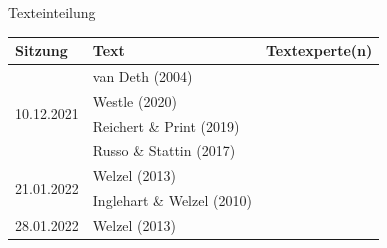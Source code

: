 \documentclass[11pt]{beamer}
\begin{document}
\begin{frame}[t]{Texteinteilung}
	\begin{center}	
		\begin{table}
			\begin{tabular}{l l l}
			\toprule[2pt]
			Sitzung & Text & Textexperte(n)\\
			\midrule
			\multirow{4}{*}{10.12.2021} & van Deth (2004) & \\
			\cmidrule{2-3}
			& Westle (2020) & \\
			\cmidrule{2-3}
			& Reichert \& Print (2019) & \\
			\cmidrule{2-3}
			& Russo \& Stattin (2017) & \\
			\midrule
			\multirow{2}{*}{21.01.2022} & Welzel (2013) & \\
			\cmidrule{2-3}
			& Inglehart \& Welzel (2010) \\
			\midrule
			28.01.2022 & Welzel (2013) & \\
			\bottomrule[2pt]
			
			\end{tabular}
		\end{table}
	\end{center}
\end{frame}
\end{document}
